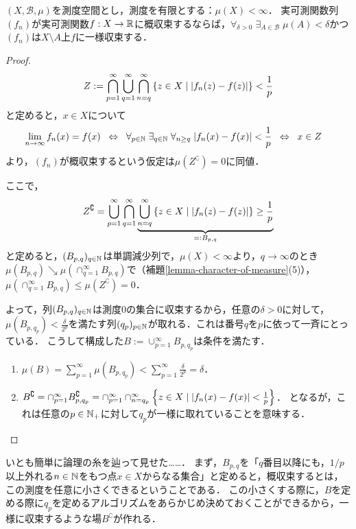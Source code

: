 \documentclass[uplatex, dvipdfmx]{jsreport}
\renewcommand{\B}{\mathcal{B}}
\begin{document}
\begin{theorem}\label{thm-Egorov}
    $(X,\B,\mu)$を測度空間とし，測度を有限とする：$\mu(X)<\infty$．
    実可測関数列$(f_n)$が実可測関数$f:X\to\mathbb{R}$に概収束するならば，$\forall_{\delta>0}\;\exists_{A\in\B}\;\mu(A)<\delta$かつ$(f_n)$は$X\setminus A$上$f$に一様収束する．
\end{theorem}
\begin{proof}
    \[Z:=\bigcap^\infty_{p=1}\bigcup_{q=1}^\infty\bigcap^\infty_{n=q}\left\{z\in X\mid \lvert f_n(z)-f(z)\rvert\right\}<\frac{1}{p}\]
    と定めると，$x\in X$について
    \begin{align*}
        \lim_{n\to\infty}f_n(x)=f(x)&\;\;\Leftrightarrow\;\; \forall_{p\in\mathbb{N}}\;\exists_{q\in\mathbb{N}}\;\forall_{n\ge q}\;\lvert f_n(x)-f(x)\rvert<\frac{1}{p}\;\;\Leftrightarrow\;\; x\in Z
    \end{align*}
    より，$(f_n)$が概収束するという仮定は$\mu(Z^\complement)=0$に同値．

    ここで，
    \[Z^\complement=\bigcup^\infty_{p=1}\bigcap_{q=1}^\infty\underbrace{\bigcup^\infty_{n=q}\left\{z\in X\mid \lvert f_n(z)-f(z)\rvert\right\}\ge\frac{1}{p}}_{=:B_{p,q}}\]
    と定めると，$(B_{p,q})_{q\in\mathbb{N}}$は単調減少列で，$\mu(X)<\infty$より，$q\to\infty$のとき$\mu(B_{p,q})\searrow \mu(\cap^\infty_{q=1}B_{p,q})$で（補題\ref{lemma-character-of-measure}(5)），
    $\mu(\cap^\infty_{q=1}B_{p,q})\le\mu(Z^\complement)=0$．

    よって，列$(B_{p,q})_{q\in\mathbb{N}}$は測度$0$の集合に収束するから，任意の$\delta>0$に対して，
    $\mu(B_{p,q_p})<\frac{\delta}{2^p}$を満たす列$(q_p)_{p\in\mathbb{N}}$が取れる．これは番号$q$を$p$に依って一斉にとっている．
    こうして構成した$B:=\cup^\infty_{p=1}B_{p,q_p}$は条件を満たす．
    \begin{enumerate}
        \item $\mu(B)=\sum^\infty_{p=1}\mu(B_{p,q_p})<\sum^\infty_{p=1}\frac{\delta}{2^p}=\delta$．
        \item $B^\complement=\cap^\infty_{p=1}B^\complement_{p,q_p}=\cap^\infty_{p=1}\cap^\infty_{n=q_p}\left\{z\in X\mid \lvert f_n(x)-f(x)\rvert<\frac{1}{p}\right\}$．
        となるが，これは任意の$p\in\mathbb{N}_+$に対して$q_p$が一様に取れていることを意味する．
    \end{enumerate}
\end{proof}
\begin{remarks}
    いとも簡単に論理の糸を辿って見せた……．
    まず，$B_{p,q}$を「$q$番目以降にも，$1/p$以上外れる$n\in\mathbb{N}$をもつ点$x\in X$からなる集合」と定めると，概収束するとは，この測度を任意に小さくできるということである．
    この小さくする際に，$B$を定める際に$q_p$を定めるアルゴリズムをあらかじめ決めておくことができるから，一様に収束するような場$B^\complement$が作れる．
\end{remarks}
\end{document}
